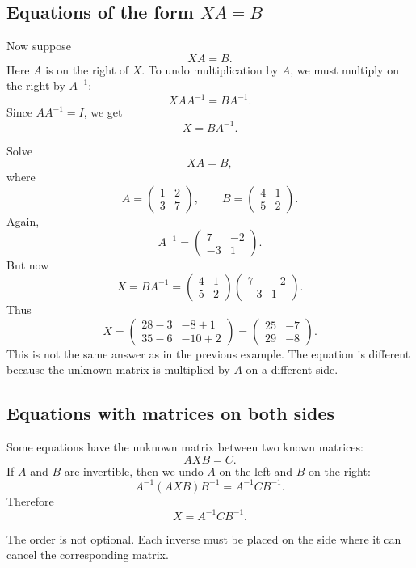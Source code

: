 \subsection{Equations of the form \(XA=B\)}

Now suppose
\[
XA=B.
\]
Here \(A\) is on the right of \(X\). To undo multiplication by \(A\), we must multiply on the right by \(A^{-1}\):
\[
XAA^{-1}=BA^{-1}.
\]
Since \(AA^{-1}=I\), we get
\[
X=BA^{-1}.
\]

\begin{examplebox}
Solve
\[
XA=B,
\]
where
\[
A=\begin{pmatrix}1&2\\3&7\end{pmatrix},
\qquad
B=\begin{pmatrix}4&1\\5&2\end{pmatrix}.
\]
Again,
\[
A^{-1}=\begin{pmatrix}7&-2\\-3&1\end{pmatrix}.
\]
But now
\[
X=BA^{-1}
=\begin{pmatrix}4&1\\5&2\end{pmatrix}
\begin{pmatrix}7&-2\\-3&1\end{pmatrix}.
\]
Thus
\[
X=\begin{pmatrix}
28-3&-8+1\\
35-6&-10+2
\end{pmatrix}
=\begin{pmatrix}
25&-7\\
29&-8
\end{pmatrix}.
\]
This is not the same answer as in the previous example. The equation is different because the unknown matrix is multiplied by \(A\) on a different side.
\end{examplebox}

\subsection{Equations with matrices on both sides}

Some equations have the unknown matrix between two known matrices:
\[
AXB=C.
\]
If \(A\) and \(B\) are invertible, then we undo \(A\) on the left and \(B\) on the right:
\[
A^{-1}(AXB)B^{-1}=A^{-1}CB^{-1}.
\]
Therefore
\[
X=A^{-1}CB^{-1}.
\]

The order is not optional. Each inverse must be placed on the side where it can cancel the corresponding matrix.

